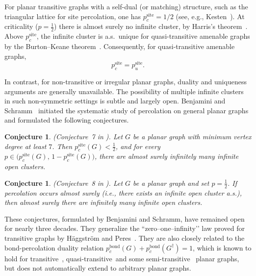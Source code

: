 \documentclass[11pt]{amsart}
\theoremstyle{plain}
\newtheorem{conjecture}[theorem]{Conjecture}
\numberwithin{equation}{section}
\numberwithin{figure}{section}
\begin{document}
For planar transitive graphs with a self-dual (or matching) structure, such as the triangular lattice for site percolation, one has
\(p_c^{\mathrm{site}}=1/2\) (see, e.g., Kesten~\cite{Kesten1980,Kesten1982}). 
At criticality ($p=\frac{1}{2}$) there is almost surely no infinite cluster, by Harris's theorem~\cite{HL60}. 
Above \(p_c^{\mathrm{site}}\), the infinite cluster is a.s.\ unique for quasi-transitive amenable graphs by the Burton--Keane theorem~\cite{BurtonKeane1989}. 
Consequently, for quasi-transitive amenable graphs,
\[
  p_c^{\mathrm{site}} = p_u^{\mathrm{site}}.
\]



\medskip
In contrast, for non-transitive or irregular planar graphs,
duality and uniqueness arguments are generally unavailable.
The possibility of multiple infinite clusters in such non-symmetric settings
is subtle and largely open.
Benjamini and Schramm~\cite{bs96} initiated the systematic study of
percolation on general planar graphs and formulated the following conjectures.

\begin{conjecture}\label{c7bs}
(\emph{Conjecture~7} in \cite{bs96}).
Let \(G\) be a planar graph with minimum vertex degree at least \(7\).
Then \(p_c^{\mathrm{site}}(G) < \tfrac{1}{2}\), and for every
\(p \in \bigl(p_c^{\mathrm{site}}(G),\, 1 - p_c^{\mathrm{site}}(G)\bigr)\),
there are almost surely infinitely many infinite open clusters.
\end{conjecture}

\begin{conjecture}\label{c8bs}
(\emph{Conjecture~8} in \cite{bs96}).
Let \(G\) be a planar graph and set \(p=\tfrac{1}{2}\).
If percolation occurs almost surely (i.e., there exists an infinite open cluster a.s.),
then almost surely there are infinitely many infinite open clusters.
\end{conjecture}









These conjectures, formulated by Benjamini and Schramm, have remained open for nearly three decades.
They generalize the “zero–one–infinity’’ law proved for transitive graphs by Häggström and Peres~\cite{HaggstromPeres1999}.
They are also closely related to the bond-percolation duality relation
\(p_c^{\mathrm{bond}}(G)+p_c^{\mathrm{bond}}(G^\dagger)=1\),
which is known to hold for transitive~\cite{bsjams}, quasi-transitive~\cite{GrZL22,GrZL221}and some semi-transitive~\cite{ZL23} planar graphs,
but does not automatically extend to arbitrary planar graphs.
\end{document}
